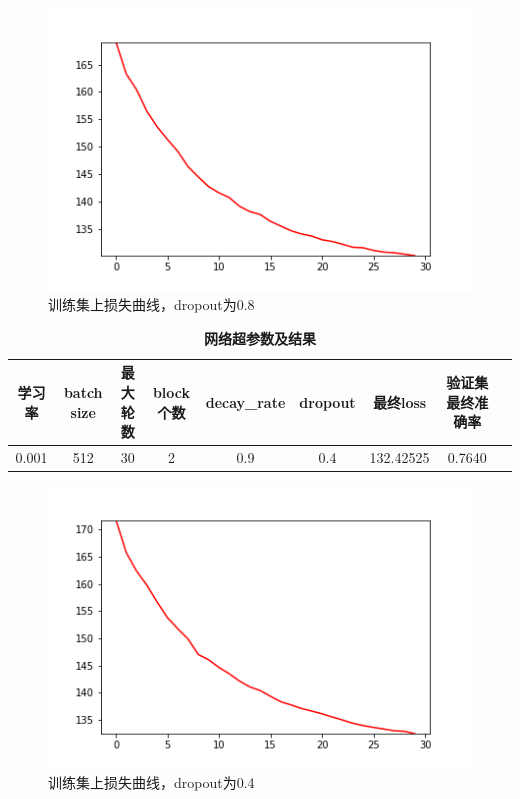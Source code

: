 \documentclass{article}
\begin{document}
\begin{figure}[!ht]
	\centering %
	\includegraphics[scale=0.5]{runing-loss-4.png}
	\caption{训练集上损失曲线，dropout为0.8}
\end{figure}



\begin{table}[!ht]
	\caption{\textbf{网络超参数及结果}}%
	\centering%
	\begin{tabular}{ccccccccc}
		\hline
		学习率    & batch size & 最大轮数 & block个数 & decay\_rate & dropout & 最终loss & 验证集最终准确率\\ \hline
		0.001 & 512    & 30  &  2  & 0.9 &0.4 & 132.42525  & 0.7640   \\ \hline
	\end{tabular}
\end{table}

\clearpage

\begin{figure}[!ht]
	\centering %
	\includegraphics[scale=0.5]{runing-loss-7.png}
	\caption{训练集上损失曲线，dropout为0.4}
\end{figure}	
\end{document}
